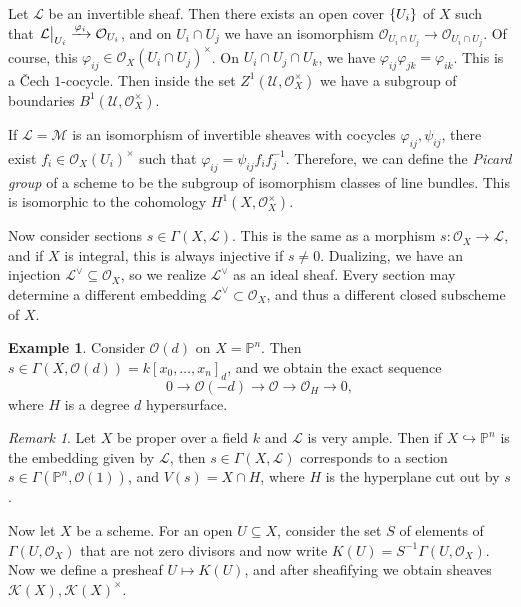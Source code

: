 \documentclass[leqno, openany]{memoir}
\theoremstyle{definition}
\newtheorem{exm}[thm]{Example}
\theoremstyle{remark}
\newtheorem{rmk}[thm]{Remark}
\theoremstyle{plain}
\theoremstyle{definition}
\theoremstyle{remark}
\renewcommand{\P}{\mathbb{P}}
\newcommand{\mc}[1]{\mathcal{#1}}
\begin{document}
Let $\mc{L}$ be an invertible sheaf. Then there exists an open cover $\qty{U_i}$ of $X$ such that $\eval{\mc{L}}_{U_i} \xrightarrow{\varphi_i} \mc{O}_{U_i}$, and on $U_i \cap U_j$ we have an isomorphism $\mc{O}_{U_i \cap U_j} \to \mc{O}_{U_i \cap U_j}$. Of course, this $\varphi_{ij} \in {\mc{O}_X(U_i \cap U_j)}^{\times}$. On $U_i \cap U_j \cap U_k$, we have $\varphi_{ij} \varphi_{jk} = \varphi_{ik}$. This is a {\v{C}}ech $1$-cocycle. Then inside the set $Z^1(\mc{U}, \mc{O}_X^{\times})$ we have a subgroup of boundaries $B^1(\mc{U}, \mc{O}_X^{\times})$. 

If $\mc{L} = \mc{M}$ is an isomorphism of invertible sheaves with cocycles $\varphi_{ij}, \psi_{ij}$, there exist $f_i \in {\mc{O}_X(U_i)}^{\times}$ such that $\varphi_{ij} = \psi_{ij} f_i f_j^{-1}$. Therefore, we can define the \textit{Picard group} of a scheme to be the subgroup of isomorphism classes of line bundles. This is isomorphic to the cohomology $H^1(X, \mc{O}_X^{\times})$.

Now consider sections $s \in \Gamma(X, \mc{L})$. This is the same as a morphism $s \colon \mc{O}_X \to \mc{L}$, and if $X$ is integral, this is always injective if $s \neq 0$. Dualizing, we have an injection $\mc{L}^{\vee} \subseteq \mc{O}_X$, so we realize $\mc{L}^{\vee}$ as an ideal sheaf. Every section may determine a different embedding $\mc{L}^{\vee} \subset \mc{O}_X$, and thus a different closed subscheme of $X$.

\begin{exm}
    Consider $\mc{O}(d)$ on $X = \P^n$. Then $s \in \Gamma(X, \mc{O}(d)) = {k[x_0, \ldots, x_n]}_d$, and we obtain the exact sequence 
    \[ 0 \to \mc{O}(-d) \to \mc{O} \to \mc{O}_H \to 0, \]
    where $H$ is a degree $d$ hypersurface.
\end{exm}

\begin{rmk}
    Let $X$ be proper over a field $k$ and $\mc{L}$ is very ample. Then if $X \hookrightarrow \P^n$ is the embedding given by $\mc{L}$, then $s \in \Gamma(X, \mc{L})$ corresponds to a section $s \in \Gamma(\P^n, \mc{O}(1))$, and $V(s) = X \cap H$, where $H$ is the hyperplane cut out by $s$.
\end{rmk}

Now let $X$ be a scheme. For an open $U \subseteq X$, consider the set $S$ of elements of $\Gamma(U, \mc{O}_X)$ that are not zero divisors and now write $K(U) = S^{-1} \Gamma(U, \mc{O}_X)$. Now we define a presheaf $U \mapsto K(U)$, and after sheafifying we obtain sheaves $\mc{K}(X), {\mc{K}(X)}^{\times}$.
\end{document}
